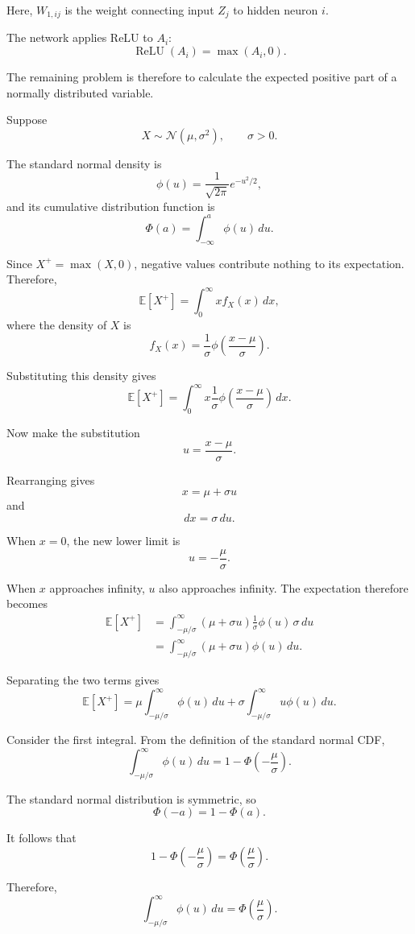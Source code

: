 Here, \(W_{1,ij}\) is the weight connecting input \(Z_j\) to hidden neuron \(i\).

The network applies ReLU to \(A_i\):
\[
\operatorname{ReLU}(A_i)
=
\max(A_i,0).
\]

The remaining problem is therefore to calculate the expected positive part of a normally distributed variable.

Suppose
\[
X\sim\mathcal{N}(\mu,\sigma^2),
\qquad
\sigma>0.
\]

The standard normal density is
\[
\phi(u)
=
\frac{1}{\sqrt{2\pi}}e^{-u^2/2},
\]
and its cumulative distribution function is
\[
\Phi(a)
=
\int_{-\infty}^{a}\phi(u)\,du.
\]

Since \(X^+=\max(X,0)\), negative values contribute nothing to its expectation. Therefore,
\[
\mathbb{E}[X^+]
=
\int_0^\infty x f_X(x)\,dx,
\]
where the density of \(X\) is
\[
f_X(x)
=
\frac{1}{\sigma}
\phi\left(
\frac{x-\mu}{\sigma}
\right).
\]

Substituting this density gives
\[
\mathbb{E}[X^+]
=
\int_0^\infty
x\frac{1}{\sigma}
\phi\left(
\frac{x-\mu}{\sigma}
\right)
\,dx.
\]

Now make the substitution
\[
u=\frac{x-\mu}{\sigma}.
\]

Rearranging gives
\[
x=\mu+\sigma u
\]
and
\[
dx=\sigma\,du.
\]

When \(x=0\), the new lower limit is
\[
u=-\frac{\mu}{\sigma}.
\]

When \(x\) approaches infinity, \(u\) also approaches infinity. The expectation therefore becomes
\[
\begin{aligned}
\mathbb{E}[X^+]
&=
\int_{-\mu/\sigma}^{\infty}
(\mu+\sigma u)
\frac{1}{\sigma}
\phi(u)\,
\sigma\,du \\
&=
\int_{-\mu/\sigma}^{\infty}
(\mu+\sigma u)\phi(u)\,du.
\end{aligned}
\]

Separating the two terms gives
\[
\mathbb{E}[X^+]
=
\mu
\int_{-\mu/\sigma}^{\infty}
\phi(u)\,du
+
\sigma
\int_{-\mu/\sigma}^{\infty}
u\phi(u)\,du.
\]

Consider the first integral. From the definition of the standard normal CDF,
\[
\int_{-\mu/\sigma}^{\infty}
\phi(u)\,du
=
1-\Phi\left(-\frac{\mu}{\sigma}\right).
\]

The standard normal distribution is symmetric, so
\[
\Phi(-a)=1-\Phi(a).
\]

It follows that
\[
1-\Phi\left(-\frac{\mu}{\sigma}\right)
=
\Phi\left(\frac{\mu}{\sigma}\right).
\]

Therefore,
\[
\int_{-\mu/\sigma}^{\infty}
\phi(u)\,du
=
\Phi\left(\frac{\mu}{\sigma}\right).
\]

